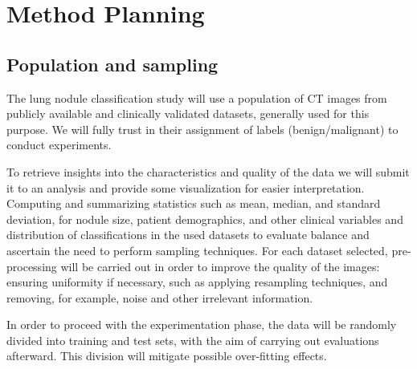 \chapter{Method Planning }\label{chap:chap4}

        
\section{Population and sampling}
    The lung nodule classification study will use a population of CT images from publicly available and clinically validated datasets, generally used for this purpose. We will fully trust in their assignment of labels (benign/malignant) to conduct experiments. 
    
    To retrieve insights into the characteristics and quality of the data we will submit it to an analysis and provide some visualization for easier interpretation. Computing and summarizing statistics such as mean, median, and standard deviation, for nodule size, patient demographics, and other clinical variables and distribution of classifications in the used datasets to evaluate balance and ascertain the need to perform sampling techniques. For each dataset selected, pre-processing will be carried out in order to improve the quality of the images: ensuring uniformity if necessary, such as applying resampling techniques, and removing, for example, noise and other irrelevant information.
    
    In order to proceed with the experimentation phase, the data will be randomly divided into training and test sets, with the aim of carrying out evaluations afterward. This division will mitigate possible over-fitting effects.
        
